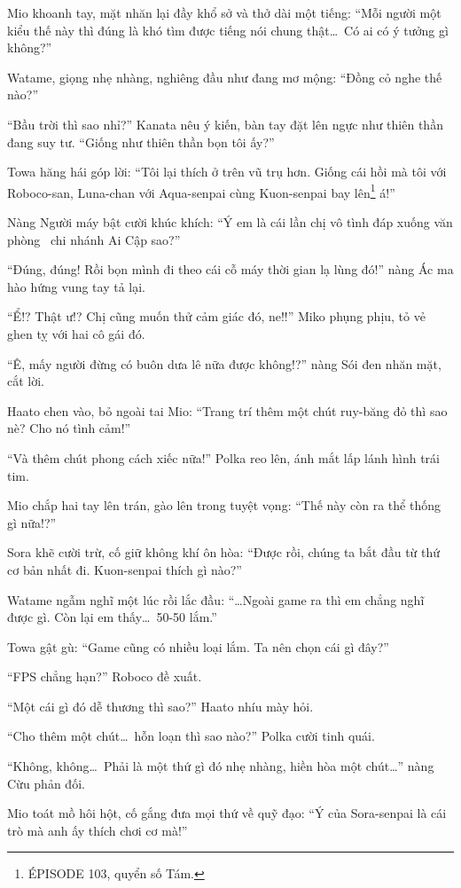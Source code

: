 \documentclass[../main.tex]{subfiles}
\begin{document}
Mio khoanh tay, mặt nhăn lại đầy khổ sở và thở dài một tiếng: ``Mỗi người một kiểu thế này thì đúng là khó tìm được tiếng nói chung thật\dots\ Có ai có ý tưởng gì không?''

Watame, giọng nhẹ nhàng, nghiêng đầu như đang mơ mộng: ``Đồng cỏ nghe thế nào?''

``Bầu trời thì sao nhỉ?'' Kanata nêu ý kiến, bàn tay đặt lên ngực như thiên thần đang suy tư. ``Giống như thiên thần bọn tôi ấy?''

Towa hăng hái góp lời: ``Tôi lại thích ở trên vũ trụ hơn. Giống cái hồi mà tôi với Roboco-san, Luna-chan với Aqua-senpai cùng Kuon-senpai bay lên\footnote{{\flaregothic ÉPISODE 103}, quyển số Tám.} á!''

Nàng Người máy bật cười khúc khích: ``Ý em là cái lần chị vô tình đáp xuống văn phòng \hll\ chi nhánh Ai Cập sao?''

``Đúng, đúng! Rồi bọn mình đi theo cái cỗ máy thời gian lạ lùng đó!'' nàng Ác ma hào hứng vung tay tả lại.

``Ể!? Thật ư!? Chị cũng muốn thử cảm giác đó, ne!!'' Miko phụng phịu, tỏ vẻ ghen tỵ với hai cô gái đó.

``Ê, mấy người đừng có buôn dưa lê nữa được không!?'' nàng Sói đen nhăn mặt, cắt lời.

Haato chen vào, bỏ ngoài tai Mio: ``Trang trí thêm một chút ruy-băng đỏ thì sao nè? Cho nó tình cảm!''

``Và thêm chút phong cách xiếc nữa!''  Polka reo lên, ánh mắt lấp lánh hình trái tim.

Mio chắp hai tay lên trán, gào lên trong tuyệt vọng: ``Thế này còn ra thể thống gì nữa!?''

Sora khẽ cười trừ, cố giữ không khí ôn hòa: ``Được rồi, chúng ta bắt đầu từ thứ cơ bản nhất đi. Kuon-senpai thích gì nào?''

Watame ngẫm nghĩ một lúc rồi lắc đầu: ``\dots Ngoài game ra thì em chẳng nghĩ được gì. Còn lại em thấy\dots\ 50-50 lắm.''

Towa gật gù: ``Game cũng có nhiều loại lắm. Ta nên chọn cái gì đây?''

``FPS chẳng hạn?'' Roboco đề xuất.

``Một cái gì đó dễ thương thì sao?'' Haato nhíu mày hỏi.

``Cho thêm một chút\dots\ hỗn loạn thì sao nào?'' Polka cười tinh quái.

``Không, không\dots\ Phải là một thứ gì đó nhẹ nhàng, hiền hòa một chút\dots'' nàng Cừu phản đối.

Mio toát mồ hôi hột, cố gắng đưa mọi thứ về quỹ đạo: ``Ý của Sora-senpai là cái trò mà anh ấy thích chơi cơ mà!''
\end{document}
